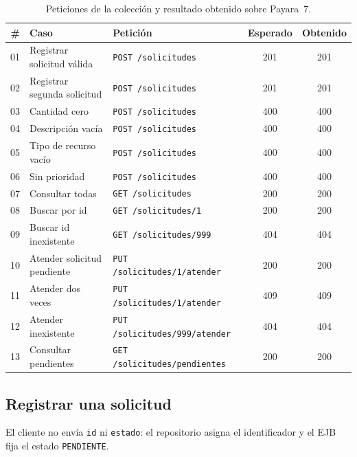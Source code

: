 \documentclass[11pt,letterpaper]{article}
\begin{document}
\begin{table}[H]
\centering\small
\caption{Peticiones de la colección y resultado obtenido sobre Payara~7.}
\begin{tabularx}{\linewidth}{r >{\raggedright\arraybackslash}X l c c}
\toprule
\textbf{\#} & \textbf{Caso} & \textbf{Petición} & \textbf{Esperado} & \textbf{Obtenido} \\
\midrule
01 & Registrar solicitud válida      & \texttt{POST /solicitudes}             & 201 & 201 \\
02 & Registrar segunda solicitud     & \texttt{POST /solicitudes}             & 201 & 201 \\
03 & Cantidad cero                   & \texttt{POST /solicitudes}             & 400 & 400 \\
04 & Descripción vacía               & \texttt{POST /solicitudes}             & 400 & 400 \\
05 & Tipo de recurso vacío           & \texttt{POST /solicitudes}             & 400 & 400 \\
06 & Sin prioridad                   & \texttt{POST /solicitudes}             & 400 & 400 \\
07 & Consultar todas                 & \texttt{GET /solicitudes}              & 200 & 200 \\
08 & Buscar por id                   & \texttt{GET /solicitudes/1}            & 200 & 200 \\
09 & Buscar id inexistente           & \texttt{GET /solicitudes/999}          & 404 & 404 \\
10 & Atender solicitud pendiente     & \texttt{PUT /solicitudes/1/atender}    & 200 & 200 \\
11 & Atender dos veces               & \texttt{PUT /solicitudes/1/atender}    & 409 & 409 \\
12 & Atender inexistente             & \texttt{PUT /solicitudes/999/atender}  & 404 & 404 \\
13 & Consultar pendientes            & \texttt{GET /solicitudes/pendientes}   & 200 & 200 \\
\bottomrule
\end{tabularx}
\end{table}

\subsection{Registrar una solicitud}

El cliente no envía \texttt{id} ni \texttt{estado}: el repositorio asigna el identificador y
el EJB fija el estado \texttt{PENDIENTE}.
\end{document}
